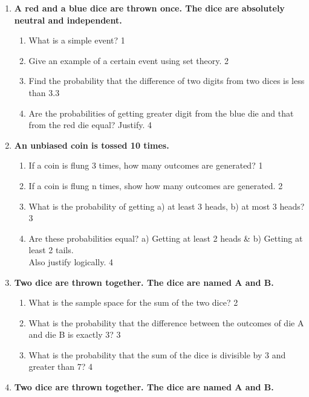 \documentclass[a4paper,oneside, margin=1.4in]{book}
\begin{document}
\begin{enumerate}
 \item
	  \textbf{A red and a blue dice are thrown once. The dice are absolutely neutral and independent.} 
  
  \begin{enumerate}
    \item
	What is a simple event? \hfill 1
    \item
	Give an example of a certain event using set theory. \hfill 2
    \item  
	Find the probability that the difference of two digits from two dices is less than 3.\hfill 3
    \item
	Are the probabilities of getting greater digit from the blue die and that from the red die equal? Justify. \hfill 4
  \end{enumerate}
  
  \item
	  \textbf{An unbiased coin is tossed 10 times.} 
  
  \begin{enumerate}
    \item
	If a coin is flung 3 times, how many outcomes are generated? \hfill 1
    \item
	If a coin is flung n times, show how many outcomes are generated. \hfill 2
    \item  
	What is the probability of getting a) at least 3 heads, b) at most 3 heads? \hfill 3
    \item
	Are these probabilities equal? a) Getting at least 2 heads \& b) Getting at least 2 tails. \\ Also justify logically. \hfill 4
  \end{enumerate}
  
  \item  
  \textbf{Two dice are thrown together. The dice are named A and B.}  

  \begin{enumerate}  
    \item  
    	What is the sample space for the sum of the two dice? \hfill 2  
    \item  
    	What is the probability that the difference between the outcomes of die A and die B is exactly 3? \hfill 3  
    \item  
    	What is the probability that the sum of the dice is divisible by 3 and greater than 7? \hfill 4  
  \end{enumerate}  

  
  \item  
  \textbf{Two dice are thrown together. The dice are named A and B.}  


\end{enumerate}
\end{document}
